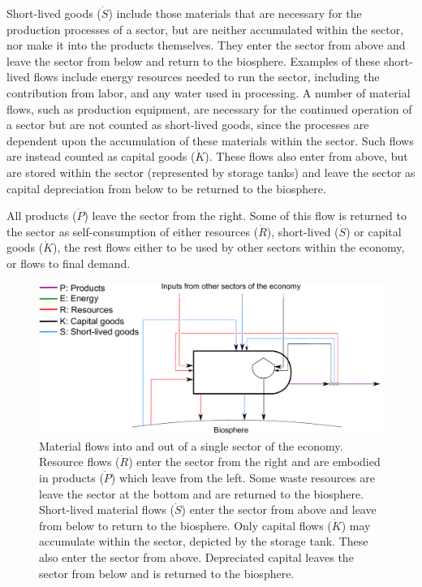 Short-lived goods ($\dot{S}$) include those materials that are necessary for the production
processes of a sector, but are neither accumulated within the sector, nor make it into
the products themselves. They enter the sector from above and leave the sector from
below and return to the biosphere. Examples of these short-lived flows include 
energy resources needed to run the sector, including the contribution from labor, and
any water used in processing. A number of material flows, such as production equipment,
are necessary for the continued operation of a sector but are not counted as short-lived
goods, since the processes are dependent upon the accumulation of these materials within
the sector. Such flows are instead counted as capital goods ($\dot{K}$). These flows also enter from
above, but are stored within the sector (represented by storage tanks) and leave the
sector as capital depreciation from below to be returned to the biosphere. 


All products ($\dot{P}$) leave the sector from the right. Some of this flow is returned to the 
sector as self-consumption of either resources ($\dot{R}$), short-lived ($\dot{S}$) or capital goods ($\dot{K}$), the rest
flows either to be used by other sectors within the economy, or flows to final demand. 


\begin{figure}[h!]
\centering
\includegraphics[width=0.8\linewidth]{Part_1/Chapter_Materials/images/PERKS_basic_unit_materials.pdf}
\caption{Material flows into and out of a single sector of the economy. Resource flows ($\dot{R}$) enter the sector from the right and are embodied in products ($\dot{P}$) which leave from the left. Some waste resources are leave the sector at the bottom and are returned to the biosphere. Short-lived material flows ($\dot{S}$) enter the sector from above and leave from below to return to the biosphere.  Only capital flows ($\dot{K}$) may accumulate within the sector, depicted by the storage tank. These also enter the sector from above. Depreciated capital leaves the sector from below and is returned to the biosphere.}
\label{fig:PERKS_materials}
\end{figure}

